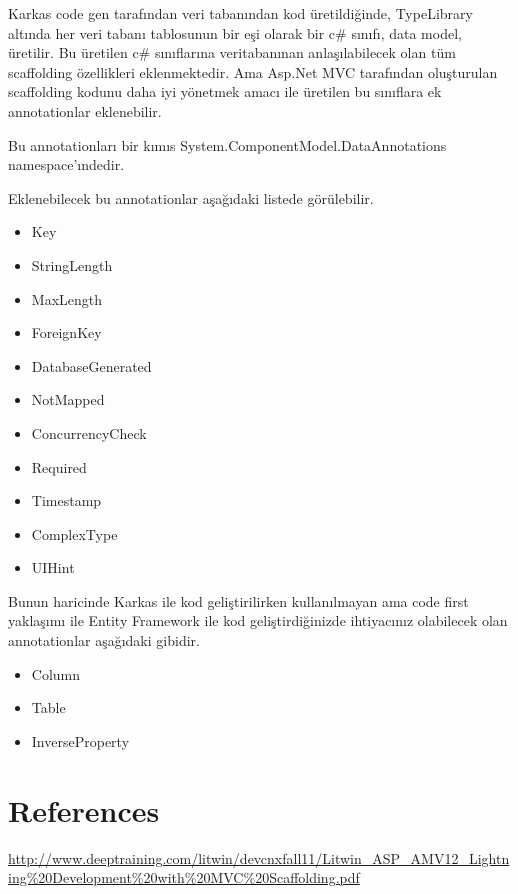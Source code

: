 \documentclass[10pt,a4paper,draft]{article}
\begin{document}
Karkas code gen tarafından veri tabanından kod üretildiğinde,
TypeLibrary altında her veri tabanı tablosunun bir eşi olarak
bir c\# sınıfı, data model, üretilir. 
Bu üretilen c\# sınıflarına veritabanınan anlaşılabilecek olan
tüm scaffolding özellikleri eklenmektedir.
Ama Asp.Net MVC tarafından oluşturulan scaffolding kodunu
daha iyi yönetmek amacı ile üretilen
bu sınıflara ek annotationlar eklenebilir.

Bu annotationları bir kımıs System.ComponentModel.DataAnnotations namespace'ındedir.



Eklenebilecek bu annotationlar aşağıdaki listede görülebilir.



\begin{itemize}

\item  Key

\item  StringLength

\item  MaxLength

\item ForeignKey

\item DatabaseGenerated

\item  NotMapped


\item  ConcurrencyCheck

\item  Required

\item  Timestamp

\item  ComplexType

\item  UIHint

\end{itemize}

Bunun haricinde Karkas ile kod geliştirilirken kullanılmayan
ama code first yaklaşımı ile Entity Framework ile kod
geliştirdiğinizde ihtiyacınız olabilecek olan
annotationlar aşağıdaki gibidir.


\begin{itemize}

\item  Column

\item Table

\item InverseProperty
\end{itemize}








\section*{References}

\url{http://www.deeptraining.com/litwin/devcnxfall11/Litwin_ASP_AMV12_Lightning%20Development%20with%20MVC%20Scaffolding.pdf}
\end{document}
